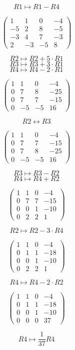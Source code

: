 \documentclass[lineaire_algebra_oplossingen.tex]{subfiles}
\begin{document}
$$ R1 \longmapsto R1 - R4$$

$$
\begin{pmatrix}
1 & 1 & 0 & -4\\
-5 & 2 & 8 & -5\\
-3 & 4 & 7 & -3\\
2 & -3 & -5 & 8
\end{pmatrix}
$$

$$R2 \longmapsto R2 + 5\cdot R1$$
$$R3 \longmapsto R3 + 3\cdot R1$$
$$R4 \longmapsto R4 - 2\cdot R1$$

$$
\begin{pmatrix}
1 & 1 & 0 & -4\\
0 & 7 & 8 & -25\\
0 & 7 & 7 & -15\\
0 & -5 & -5 & 16
\end{pmatrix}
$$

$$R2 \leftrightarrow R3$$

$$
\begin{pmatrix}
1 & 1 & 0 & -4\\
0 & 7 & 7 & -15\\
0 & 7 & 8 & -25\\
0 & -5 & -5 & 16
\end{pmatrix}
$$

$$R3 \longmapsto R3 - R2$$
$$R4 \longmapsto R4 + R2$$

$$
\begin{pmatrix}
1 & 1 & 0 & -4\\
0 & 7 & 7 & -15\\
0 & 0 & 1 & -10\\
0 & 2 & 2 & 1
\end{pmatrix}
$$

$$R2 \longmapsto R2 - 3\cdot R4$$

$$
\begin{pmatrix}
1 & 1 & 0 & -4\\
0 & 1 & 1 & -18\\
0 & 0 & 1 & -10\\
0 & 2 & 2 & 1
\end{pmatrix}
$$

$$R4 \longmapsto R4 - 2\cdot R2$$

$$
\begin{pmatrix}
1 & 1 & 0 & -4\\
0 & 1 & 1 & -18\\
0 & 0 & 1 & -10\\
0 & 0 & 0 & 37
\end{pmatrix}
$$

$$R4 \longmapsto \frac{1}{37} R4$$
\end{document}
